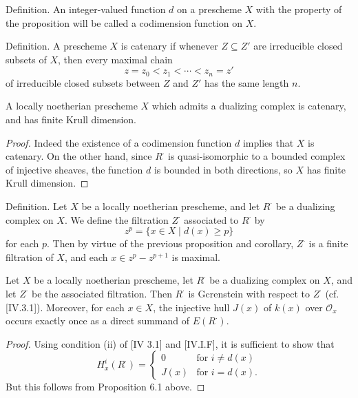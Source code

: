 \documentclass[12pt]{book}
\newcommand{\sheaf}[1]{\mathcal{#1}}
\begin{document}
Definition. An integer-valued function \(d\) on a prescheme \(X\) with the property of the proposition will be called a codimension function on \(X\).

Definition. A prescheme \(X\) is catenary if whenever \(Z \subseteq Z'\) are irreducible closed subsets of \(X\), then every maximal chain
\[
z=z_{0}<z_{1}<\cdots<z_{n}=z'
\]
of irreducible closed subsets between \(Z\) and \(Z'\) has the same length \(n\).

\begin{corollary}
A locally noetherian prescheme \(X\) which admits a dualizing complex is catenary, and has finite Krull dimension.
\end{corollary}

\setcounter{page}{284}
\begin{proof}
Indeed the existence of a codimension function \(d\) implies that \(X\) is catenary. On the other hand, since \(R^{\cdot}\) is quasi-isomorphic to a bounded complex of injective sheaves, the function \(d\) is bounded in both directions, so \(X\) has finite Krull dimension.
\end{proof}

Definition. Let \(X\) be a locally noetherian prescheme, and let \(R^{\cdot}\) be a dualizing complex on \(X\). We define the filtration \(Z^{\cdot}\) associated to \(R^{\cdot}\) by
\[
z^{p}=\{x \in X \mid d(x) \geq p\}
\]
for each \(p\). Then by virtue of the previous proposition and corollary, \(Z^{\cdot}\) is a finite filtration of \(X\), and each \(x \in z^{p}-z^{p+1}\) is maximal.

\begin{proposition}
Let \(X\) be a locally noetherian prescheme, let \(R^{\cdot}\) be a dualizing complex on \(X\), and let \(Z^{\cdot}\) be the associated filtration. Then \(R^{\cdot}\) is Gcrenstein with respect to \(Z^{\cdot}\) (cf. [IV.3.1]).
Moreover, for each \(x \in X\), the injective hull \(J(x)\) of \(k(x)\) over \(\sheaf{O}_{x}\) occurs exactly once as a direct summand of \(E(R^{\cdot})\).
\end{proposition}

\setcounter{page}{285}
\begin{proof}
Using condition (ii) of [IV 3.1] and [IV.I.F], it is sufficient to show that
\[
H_{x}^{i}\left(R^{\cdot}\right)=
\begin{cases}
0 & \text{for } i \neq d(x) \\
J(x) & \text{for } i=d(x) .
\end{cases}
\]
But this follows from Proposition 6.1 above.
\end{proof}
\end{document}
